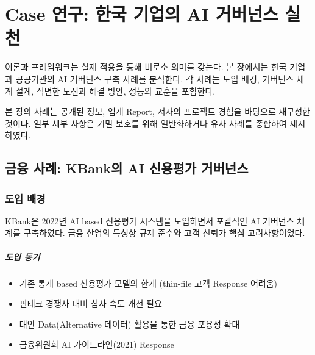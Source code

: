
\chapter{Case 연구: 한국 기업의 AI 거버넌스 실천}
\label{ch:case_studies}

이론과 프레임워크는 실제 적용을 통해 비로소 의미를 갖는다. 
본 장에서는 한국 기업과 공공기관\cite{enholm2022artificial}\cite{kuziemski2020ai}의 AI 거버넌스 구축 사례를 분석한다. 
각 사례는 도입 배경, 거버넌스 체계 설계, 직면한 도전과 해결 방안, 
성능와 교훈을 포함한다.

본 장의 사례는 공개된 정보, 업계 Report\cite{ransbotham2017reshaping}, 저자의 프로젝트 경험을 바탕으로 
재구성한 것이다. 일부 세부 사항은 기밀 보호를 위해 일반화하거나 
유사 사례를 종합하여 제시하였다.


\section{금융 사례: KBank의 AI 신용평가 거버넌스}
\label{sec:7.1}

\subsection{도입 배경}
\label{sec:7.1.1}

KBank은 2022년 AI based 신용평가 시스템을 도입\cite{dixon2020machine}하면서 
포괄적인 AI 거버넌스 체계를 구축하였다. 
금융 산업의 특성상 규제 준수와 고객 신뢰\cite{bartlett2022consumer}가 핵심 고려사항이었다.

\paragraph{도입 동기}

\begin{itemize}
 \item 기존 통계 based 신용평가 모델의 한계 (thin-file 고객 Response 어려움)
 \item 핀테크 경쟁사 대비 심사 속도 개선\cite{philippon2020fintech} 필요
 \item 대안 Data(Alternative 데이터) 활용을 통한 금융 포용성\cite{cao2022ai} 확대
 \item 금융위원회 AI 가이드라인\cite{fsc2024ai}(2021) Response
\end{itemize}


